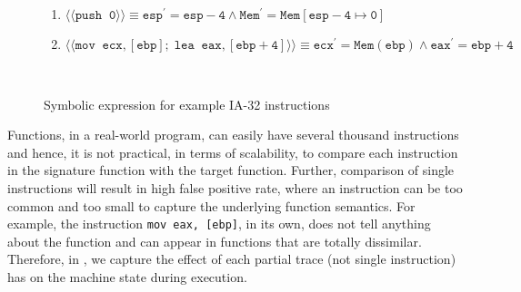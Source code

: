\begin{figure}[t]
\begin{center}\vspace{-1mm}
\begin{enumerate}
 \item $\mathtt{\langle\!\langle push \;\; 0\rangle\!\rangle\equiv esp^\prime=esp-4 \wedge Mem^\prime = Mem[esp-4\mapsto 0]}$
  \item $\mathtt{\langle\!\langle  mov \;\; ecx, [ebp];\; lea \;\; eax, [ebp+4]\rangle\!\rangle\equiv ecx^\prime = Mem(ebp) \wedge eax^\prime = ebp + 4} $
\end{enumerate}
~\\
\caption{Symbolic expression for example IA-32 instructions }
\label{fig:example-qfbv}
\end{center}
\end{figure}
Functions, in a real-world program, can easily have several thousand instructions and hence, it is not practical, in terms of scalability, to compare  each instruction in the signature function with the target function. Further, comparison of single instructions will result in high false positive rate, where an instruction can be too common and too small to capture the underlying function semantics.  For example, the instruction \texttt{mov eax, [ebp]}, in its own, does not tell anything about the function and can appear in functions that are totally dissimilar.  Therefore, in \tool, we capture the effect of each partial trace (not single instruction) has on the machine state
during execution.


